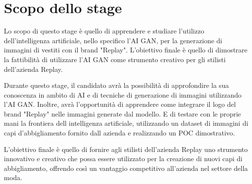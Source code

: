 \section*{Scopo dello stage}
Lo scopo di questo stage è quello di apprendere e studiare l'utilizzo dell'intelligenza artificiale,
nello specifico l'AI GAN, per la generazione di immagini di vestiti con il brand "Replay".
L'obiettivo finale è quello di dimostrare la fattibilità di utilizzare
l'AI GAN come strumento creativo per gli stilisti dell'azienda Replay.

Durante questo stage, il candidato avrà la possibilità di approfondire la sua conoscenza in ambito di
AI e di tecniche di generazione di immagini utilizzando l'AI GAN. Inoltre, avrà l'opportunità di apprendere
come integrare il logo del brand "Replay" nelle immagini generate dal modello. E di testare con le
proprie mani la frontiera dell intelligenza artificiale, utilizzando un dataset di immagini di
capi d'abbigliamento fornito dall azienda e realizzando un POC dimostrativo.

L'obiettivo finale è quello di fornire agli stilisti dell'azienda Replay uno strumento innovativo
e creativo che possa essere utilizzato per la creazione di nuovi capi di abbigliamento, offrendo così un
vantaggio competitivo all'azienda nel settore della moda.